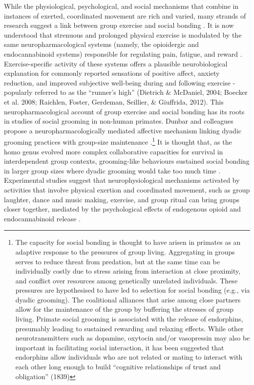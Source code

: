 \documentclass[12pt]{report}
\begin{document}
While the physiological, psychological, and social mechanisms that combine in instances of exerted, coordinated movement are rich and varied, many strands of research suggest a link between group exercise and social bonding \citep{Davis2015,Cohen2017}.  It is now understood that strenuous and prolonged physical exercise is modulated by the same neuropharmacological systems (namely, the opioidergic and endocannabinoid systems) responsible for regulating pain, fatigue, and reward \citep{Boecker2008,Raichlen2013}.
Exercise-specific activity of these systems offers a plausible neurobiological explanation for commonly reported sensations of positive affect, anxiety reduction, and improved subjective well-being during and following exercise - popularly referred to as the ``runner's high'' (Dietrich & McDaniel, 2004; Boecker et al. 2008; Raichlen, Foster, Gerdeman, Seillier, & Giuffrida, 2012).  This neuropharmacological account of group exercise and social bonding has its roots in studies of social grooming in non-human primates.  Dunbar and colleagues propose a neuropharmacologically mediated affective mechanism linking dyadic grooming practices with group-size maintenance \citep{Machin2011}.\footnote{The capacity for social bonding is thought to have arisen in primates as an adaptive response to the pressures of group living.  Aggregating in groups serves to reduce threat from predation, but at the same time can be individually costly due to stress arising from interaction at close proximity, and conflict over resources among genetically unrelated individuals.  These pressures are hypothesised to have led to selection for social bonding (e.g., via dyadic grooming). The coalitional alliances that arise among close partners allow for the maintenance of the group by buffering the stresses of group living.  Primate social grooming is associated with the release of endorphins, presumably leading to sustained rewarding and relaxing effects.  While other neurotransmitters such as dopamine, oxytocin and/or vasopressin may also be important in facilitating social interaction, it has been suggested that endorphins allow individuals who are not related or mating to interact with each other long enough to build “cognitive relationships of trust and obligation” \citep{Dunbar2012}(1839)}  It is thought that, as the homo genus evolved more complex collaborative capacities for survival in interdependent group contexts, grooming-like behaviours sustained social bonding in larger group sizes where dyadic grooming would take too much time \citep{Dunbar2012}.  Experimental studies suggest that neurophysiological mechanisms activated by activities that involve physical exertion and coordinated movement, such as group laughter, dance and music making, exercise, and group ritual can bring groups closer together, mediated by the psychological effects of endogenous opioid and endocannabinoid release \citep{Cohen2009,Fischer2014a,Fischer2014,Sullivan2014,Tarr2016,Tarr2015}.
\end{document}
